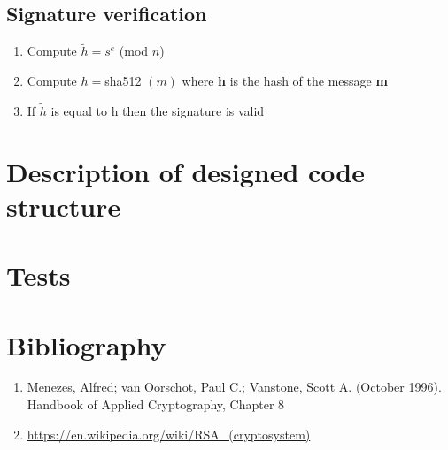 \documentclass{article}
\begin{document}
\subsection{Signature verification}
\begin{enumerate}
    \item Compute $\tilde{h} = s^e $ (mod $n$)
    \item Compute $  h = $sha512 $(m) $ where \textbf{h} is the hash of the message \textbf{m}
    \item If $\tilde{h}$ is equal to h then the signature is valid

\end{enumerate}

\newpage
\section{Description of designed code structure}
% 
\section{Tests}

\section{Bibliography}
\begin{enumerate}
\item  Menezes, Alfred; van Oorschot, Paul C.; Vanstone, Scott A. (October 1996). Handbook of Applied Cryptography, Chapter 8
\item  \url{https://en.wikipedia.org/wiki/RSA_(cryptosystem)}
\end{enumerate}
\end{document}
